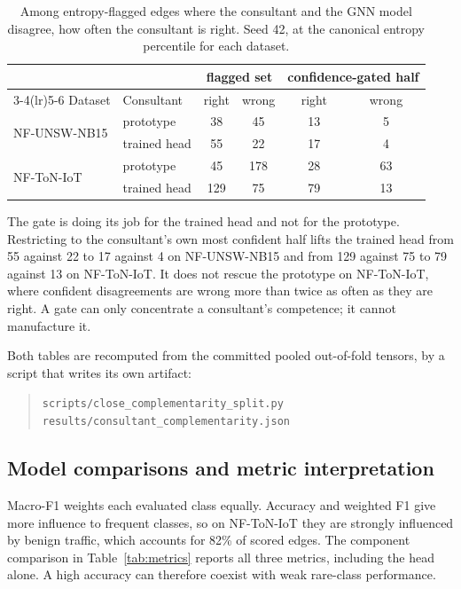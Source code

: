 \begin{table}[htbp]
\centering
\caption[Consultant correctness on disagreements]{Among entropy-flagged edges where the consultant and the GNN model disagree, how
often the consultant is right. Seed 42, at the canonical entropy percentile for each dataset.}
\label{tab:disagreement}
\small
\begin{tabular}{llcccc}
\toprule
 & & \multicolumn{2}{c}{flagged set} & \multicolumn{2}{c}{confidence-gated half} \\
\cmidrule(lr){3-4}\cmidrule(lr){5-6}
Dataset & Consultant & right & wrong & right & wrong \\
\midrule
\multirow{2}{*}{NF-UNSW-NB15}
 & prototype    & 38 & 45 & 13 & 5 \\
 & trained head & 55 & 22 & 17 & 4 \\
\midrule
\multirow{2}{*}{NF-ToN-IoT}
 & prototype    & 45 & 178 & 28 & 63 \\
 & trained head & 129 & 75 & 79 & 13 \\
\bottomrule
\end{tabular}
\end{table}

The gate is doing its job for the trained head and not for the prototype. Restricting to the
consultant's own most confident half lifts the trained head from 55 against 22 to 17 against 4
on NF-UNSW-NB15 and from 129 against 75 to 79 against 13 on NF-ToN-IoT. It does not rescue the
prototype on NF-ToN-IoT, where confident disagreements are wrong more than twice as often as
they are right. A gate can only concentrate a consultant's competence; it cannot manufacture it.

Both tables are recomputed from the committed pooled out-of-fold tensors, by a script that
writes its own artifact:

\begin{quote}
\texttt{scripts/close\_complementarity\_split.py} \\
\texttt{results/consultant\_complementarity.json}
\end{quote}

\FloatBarrier
\subsection{Model comparisons and metric interpretation}
\label{app:ladder-detail}

Macro-F1 weights each evaluated class equally. Accuracy and weighted F1 give more influence to frequent classes, so on NF-ToN-IoT they are strongly influenced by benign traffic, which accounts for 82\% of scored edges. The component comparison in Table~\ref{tab:metrics} reports all three metrics, including the head alone. A high accuracy can therefore coexist with weak rare-class performance.

